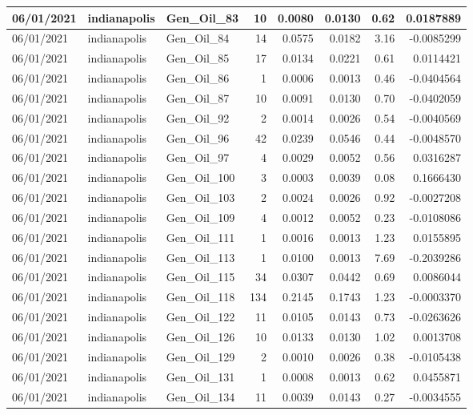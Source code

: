 \documentclass[
  letterpaper,
  DIV=11,
  numbers=noendperiod]{scrartcl}
\begin{document}
\begin{tabular}{l|l|l|r|r|r|r|r}
\hline
06/01/2021 & indianapolis & Gen\_Oil\_83 & 10 & 0.0080 & 0.0130 & 0.62 & 0.0187889\\
\hline
06/01/2021 & indianapolis & Gen\_Oil\_84 & 14 & 0.0575 & 0.0182 & 3.16 & -0.0085299\\
\hline
06/01/2021 & indianapolis & Gen\_Oil\_85 & 17 & 0.0134 & 0.0221 & 0.61 & 0.0114421\\
\hline
06/01/2021 & indianapolis & Gen\_Oil\_86 & 1 & 0.0006 & 0.0013 & 0.46 & -0.0404564\\
\hline
06/01/2021 & indianapolis & Gen\_Oil\_87 & 10 & 0.0091 & 0.0130 & 0.70 & -0.0402059\\
\hline
06/01/2021 & indianapolis & Gen\_Oil\_92 & 2 & 0.0014 & 0.0026 & 0.54 & -0.0040569\\
\hline
06/01/2021 & indianapolis & Gen\_Oil\_96 & 42 & 0.0239 & 0.0546 & 0.44 & -0.0048570\\
\hline
06/01/2021 & indianapolis & Gen\_Oil\_97 & 4 & 0.0029 & 0.0052 & 0.56 & 0.0316287\\
\hline
06/01/2021 & indianapolis & Gen\_Oil\_100 & 3 & 0.0003 & 0.0039 & 0.08 & 0.1666430\\
\hline
06/01/2021 & indianapolis & Gen\_Oil\_103 & 2 & 0.0024 & 0.0026 & 0.92 & -0.0027208\\
\hline
06/01/2021 & indianapolis & Gen\_Oil\_109 & 4 & 0.0012 & 0.0052 & 0.23 & -0.0108086\\
\hline
06/01/2021 & indianapolis & Gen\_Oil\_111 & 1 & 0.0016 & 0.0013 & 1.23 & 0.0155895\\
\hline
06/01/2021 & indianapolis & Gen\_Oil\_113 & 1 & 0.0100 & 0.0013 & 7.69 & -0.2039286\\
\hline
06/01/2021 & indianapolis & Gen\_Oil\_115 & 34 & 0.0307 & 0.0442 & 0.69 & 0.0086044\\
\hline
06/01/2021 & indianapolis & Gen\_Oil\_118 & 134 & 0.2145 & 0.1743 & 1.23 & -0.0003370\\
\hline
06/01/2021 & indianapolis & Gen\_Oil\_122 & 11 & 0.0105 & 0.0143 & 0.73 & -0.0263626\\
\hline
06/01/2021 & indianapolis & Gen\_Oil\_126 & 10 & 0.0133 & 0.0130 & 1.02 & 0.0013708\\
\hline
06/01/2021 & indianapolis & Gen\_Oil\_129 & 2 & 0.0010 & 0.0026 & 0.38 & -0.0105438\\
\hline
06/01/2021 & indianapolis & Gen\_Oil\_131 & 1 & 0.0008 & 0.0013 & 0.62 & 0.0455871\\
\hline
06/01/2021 & indianapolis & Gen\_Oil\_134 & 11 & 0.0039 & 0.0143 & 0.27 & -0.0034555\\

\end{tabular}
\end{document}
